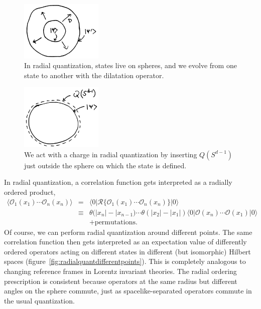 \documentclass{ws-rv9x6}
\newcommand\be{\begin{eqnarray}}
\newcommand\ee{\end{eqnarray}}
\newcommand\cO{\mathcal{O}}
\newcommand\<\langle
\renewcommand\>\rangle
\newcommand\nn{\nonumber}
\renewcommand\.{\cdot}
\begin{document}
\begin{figure}
\begin{center}
\includegraphics[width=0.35\textwidth]{radialquantization.jpg}
\end{center}
\caption{In radial quantization, states live on spheres, and we evolve from one state to another with the dilatation operator. \label{fig:radialquantization}}
\end{figure}

\begin{figure}
\begin{center}
\includegraphics[width=0.35\textwidth]{chargeactionradialquantization.jpg}
\end{center}
\caption{We act with a charge in radial quantization by inserting $Q(S^{d-1})$ just outside the sphere on which the state is defined. \label{fig:chargeactionradialquantization}}
\end{figure}

In radial quantization, a correlation function gets interpreted as a radially ordered product,
\be
\<\cO_1(x_1)\cdots \cO_n(x_n)\> &=& \<0|\mathcal{R}\{ \cO_1(x_1)\cdots \cO_n(x_n)\}|0\>\nn\\
&\equiv & \theta(|x_n|-|x_{n-1})\cdots \theta(|x_2|-|x_1|) \<0|\cO(x_n)\cdots\cO(x_1)|0\>\nn\\
&&+\mathrm{permutations}.
\ee
Of course, we can perform radial quantization around different points.  The same correlation function then gets interpreted as an expectation value of differently ordered operators acting on different states in different (but isomorphic) Hilbert spaces (figure~\ref{fig:radialquantdifferentpoints}).  This is completely analogous to changing reference frames in Lorentz invariant theories.  The radial ordering prescription is consistent because operators at the same radius but different angles on the sphere commute, just as spacelike-separated operators commute in the usual quantization.
\end{document}
